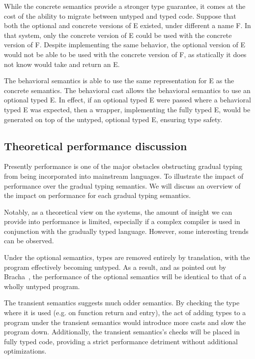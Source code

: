 \documentclass[runnningheads]{tex/llncs}
\begin{document}
While the concrete semantics provide a stronger type guarantee,
it comes at the cost of the ability to migrate between untyped and
typed code. Suppose that both the optional and concrete versions of
{\xt E} existed, under different a name {\xt F}. In that system, only the concrete
version of {\xt E} could be used with the concrete version of {\xt F}. Despite
implementing the same behavior, the optional version of {\xt E} would not be
able to be used with the concrete version of {\xt F}, as statically it does not 
know \m would take and return an {\xt E}.

The behavioral semantics is able to use the same representation for {\xt E} as
the concrete semantics. The behavioral cast allows the behavioral semantics
to use an optional typed {\xt E}. In effect, if an
optional typed {\xt E} were passed where a behavioral typed {\xt E} was
expected, then a wrapper, implementing the fully typed {\xt E}, would be
generated on top of the untyped, optional typed {\xt E}, ensuring type safety.

\subsection{Theoretical performance discussion}

Presently performance is one of the major obstacles obstructing gradual typing 
from being incorporated into mainstream languages. To illustrate the impact of 
performance over the gradual typing semantics. We will discuss an overview of 
the impact on performance for each gradual typing semantics.

Notably, as a theoretical view on the systems, the amount of insight we can
provide into performance is limited, especially if a complex compiler is used
in conjunction with the gradually typed language. However, some interesting
trends can be observed.

Under the optional semantics, types are removed entirely by translation, with
the program effectively becoming untyped. As a result, and as pointed out by
Bracha~\cite{pluggabletypes}, the performance of the optional semantics will be
identical to that of a wholly untyped program.

The transient semantics suggests much odder semantics. By checking the type
where it is used (e.g. on function return and entry), the act of adding types
to a program under the transient semantics would introduce more casts and slow
the program down. Additionally, the transient semantics's checks will be placed
in fully typed code, providing a strict performance detriment without additional
optimizations.
\end{document}
